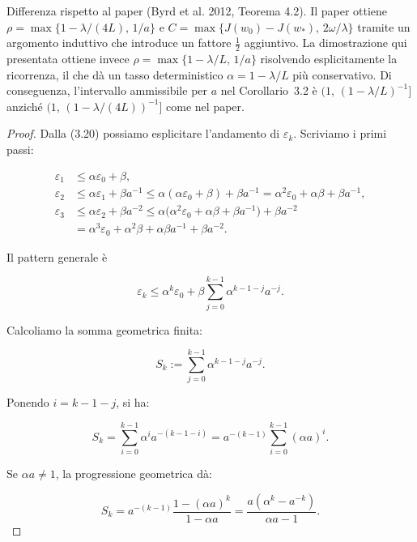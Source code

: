 \documentclass[a4paper,12pt]{article}
\begin{document}
\begin{notebox}
  Differenza rispetto al paper (Byrd et al. 2012, Teorema 4.2).
  Il paper ottiene \(\rho = \max\{1-\lambda/(4L),\,1/a\}\) e \(C = \max\{J(w_0)-J(w_*),\,2\omega/\lambda\}\) tramite un argomento induttivo che introduce un fattore \(\tfrac{1}{2}\) aggiuntivo. La dimostrazione qui presentata ottiene invece \(\rho = \max\{1-\lambda/L,\,1/a\}\) risolvendo esplicitamente la ricorrenza, il che dà un tasso deterministico \(\alpha = 1-\lambda/L\) più conservativo. Di conseguenza, l'intervallo ammissibile per \(a\) nel Corollario~3.2 è \((1,\,(1-\lambda/L)^{-1}]\) anziché \((1,\,(1-\lambda/(4L))^{-1}]\) come nel paper.
\end{notebox}
\begin{proof}


Dalla (3.20) possiamo esplicitare l'andamento di $\varepsilon_k$. Scriviamo i primi passi:

\begin{align*}
\varepsilon_1 &\le \alpha \varepsilon_0 + \beta, \\
\varepsilon_2 &\le \alpha \varepsilon_1 + \beta a^{-1}
\le \alpha(\alpha \varepsilon_0 + \beta)+\beta a^{-1}
= \alpha^2 \varepsilon_0 + \alpha\beta + \beta a^{-1}, \\
\varepsilon_3 &\le \alpha \varepsilon_2 + \beta a^{-2}
\le \alpha\bigl(\alpha^2 \varepsilon_0 + \alpha\beta + \beta a^{-1}\bigr) + \beta a^{-2} \\
&= \alpha^3 \varepsilon_0 + \alpha^2\beta + \alpha\beta a^{-1} + \beta a^{-2}.
\end{align*}

Il pattern generale è

\begin{equation}
\varepsilon_k \le \alpha^k \varepsilon_0 + \beta \sum_{j=0}^{k-1} \alpha^{k-1-j} a^{-j}. \tag{3.22}
\end{equation}

Calcoliamo la somma geometrica finita:

\[
S_k := \sum_{j=0}^{k-1} \alpha^{k-1-j} a^{-j}.
\]

Ponendo $i = k-1-j$, si ha:

\[
S_k = \sum_{i=0}^{k-1} \alpha^{i} a^{-(k-1-i)}
= a^{-(k-1)} \sum_{i=0}^{k-1} (\alpha a)^i.
\]

Se $\alpha a \neq 1$, la progressione geometrica dà:

\begin{equation}
S_k = a^{-(k-1)} \frac{1 - (\alpha a)^k}{1 - \alpha a}
= \frac{a(\alpha^k - a^{-k})}{\alpha a - 1}. \tag{3.23}
\end{equation}


\end{proof}
\end{document}
